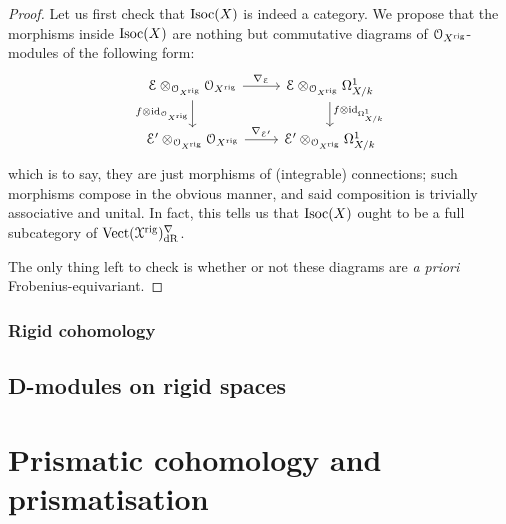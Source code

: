                \begin{proof}
                    Let us first check that $\mathrm{Isoc}(X)$ is indeed a category. We propose that the morphisms inside $\mathrm{Isoc}(X)$ are nothing but commutative diagrams of $\mathcal{O}_{X^{\mathrm{rig}}}$-modules of the following form:
                        $$
                            \begin{tikzcd}
                            	{\E \tensor_{\calO_{X^{\rig}}} \calO_{X^{\rig}}} & {\E \tensor_{\calO_{X^{\rig}}} \Omega^1_{X/k}} \\
                            	{\E' \tensor_{\calO_{X^{\rig}}} \calO_{X^{\rig}}} & {\E' \tensor_{\calO_{X^{\rig}}} \Omega^1_{X/k}}
                            	\arrow["{f \tensor \id_{\Omega^1_{X/k}}}", from=1-2, to=2-2]
                            	\arrow["{f \tensor \id_{\calO_{X^{\rig}}}}"', from=1-1, to=2-1]
                            	\arrow["{\nabla_{\E'}}", from=2-1, to=2-2]
                            	\arrow["{\nabla_{\E}}", from=1-1, to=1-2]
                            \end{tikzcd}
                        $$
                    which is to say, they are just morphisms of (integrable) connections; such morphisms compose in the obvious manner, and said composition is trivially associative and unital. In fact, this tells us that $\mathrm{Isoc}(X)$ ought to be a full subcategory of $\mathrm{Vect}(\mathcal{X}^{\mathrm{rig}})^{\nabla}_{\mathrm{dR}}$. 
                    
                    The only thing left to check is whether or not these diagrams are \textit{a priori} Frobenius-equivariant. 
                \end{proof}
                
            \subsubsection{Rigid cohomology}
        
        \subsection{D-modules on rigid spaces}
        
    \section{Prismatic cohomology and prismatisation}